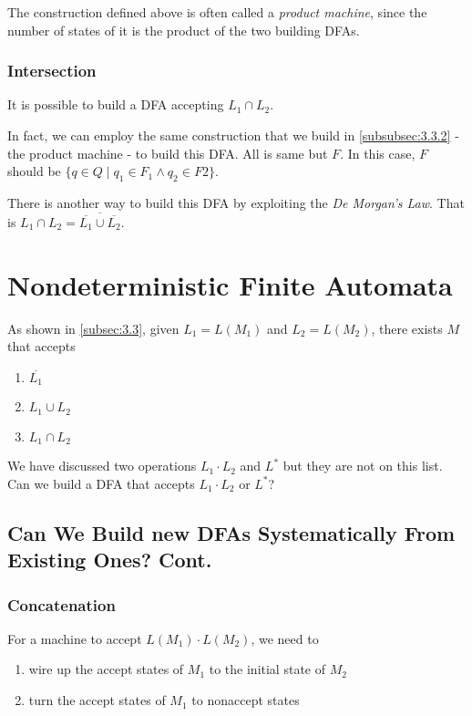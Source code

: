 \documentclass[11pt]{article}
\begin{document}
The construction defined above is often called a \emph{product machine}, since the
number of states of it is the product of the two building DFAs.

\subsubsection{Intersection}

It is possible to build a DFA accepting $L_1 \cap L_2$.

In fact, we can employ the same construction that we build in \ref{subsubsec:3.3.2}
- the product machine - to build this DFA. All is same but $F$. In this case, $F$
should be $\{q \in Q \mid q_1 \in F_1 \wedge q_2 \in F2\}$.

There is another way to build this DFA by exploiting the \emph{De Morgan's Law}.
That is $L_1 \cap L_2 = \overline{\overline{L_1} \cup \overline{L_2}}$.

\section{Nondeterministic Finite Automata} \label{sec:4}

As shown in \ref{subsec:3.3}, given $L_1 = L(M_1)$ and $L_2 = L(M_2)$, there exists
$M$ that accepts
\begin{enumerate}
\item $\overline{L_1}$
\item $L_1 \cup L_2$
\item $L_1 \cap L_2$
\end{enumerate}

We have discussed two operations $L_1 \cdot L_2$ and $L^\ast$ but they are not on
this list. Can we build a DFA that accepts $L_1 \cdot L_2$ or $L^\ast$?

\subsection{Can We Build new DFAs Systematically From Existing Ones? Cont.}

\subsubsection{Concatenation} \label{subsubsec:4.1.1}

For a machine to accept $L(M_1) \cdot L(M_2)$, we need to

\begin{enumerate}
\item wire up the accept states of $M_1$ to the initial state of $M_2$
\item turn the accept states of $M_1$ to nonaccept states
\end{enumerate}
\end{document}
